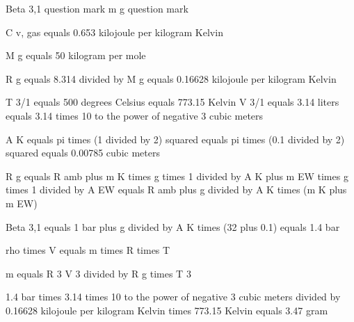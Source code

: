 Beta 3,1 question mark  
m g question mark  

C v, gas equals 0.653 kilojoule per kilogram Kelvin  

M g equals 50 kilogram per mole  

R g equals 8.314 divided by M g equals 0.16628 kilojoule per kilogram Kelvin  

T 3/1 equals 500 degrees Celsius equals 773.15 Kelvin  
V 3/1 equals 3.14 liters equals 3.14 times 10 to the power of negative 3 cubic meters  

A K equals pi times (1 divided by 2) squared equals pi times (0.1 divided by 2) squared equals 0.00785 cubic meters  

R g equals R amb plus m K times g times 1 divided by A K plus m EW times g times 1 divided by A EW equals R amb plus g divided by A K times (m K plus m EW)  

Beta 3,1 equals 1 bar plus g divided by A K times (32 plus 0.1) equals 1.4 bar  

rho times V equals m times R times T  

m equals R 3 V 3 divided by R g times T 3  

1.4 bar times 3.14 times 10 to the power of negative 3 cubic meters divided by 0.16628 kilojoule per kilogram Kelvin times 773.15 Kelvin equals 3.47 gram